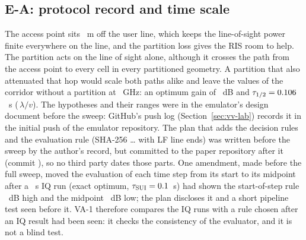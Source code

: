 \subsection{E-A: protocol record and time scale}
The access point sits \numEaApOffsetM~m off the user line, which keeps
the line-of-sight power finite everywhere on the line, and the partition loss gives the RIS
room to help. The partition acts on the line of sight alone, although it crosses the path from
the access point to every cell in every partitioned geometry. A partition that also attenuated
that hop would scale both paths alike and leave the values of the corridor without a
partition at \numEaFcOneGHz~GHz: an optimum gain of \numEaGainAzero~dB and
$\tau_{1/2}=0.106$~s (\numEaTauLvNoPart\,$\lambda/v$). The
hypotheses and their ranges were in the emulator's design document before the sweep: GitHub's
push log (Section~\ref{sec:vv-lab}) records it in the initial push of the emulator repository.
The plan that adds the decision rules and the evaluation rule (SHA-256 \txtEaPlanSha\ldots{}
with LF line ends) was written before the sweep by the author's record, but committed to the
paper repository after it (commit \txtEaPlanCommit), so no third party dates those parts. One
amendment, made before the full sweep, moved the evaluation of each time step from its start
to its midpoint after a \numEaSmokeS~s IQ run (exact optimum,
$\tau_{\mathrm{SUI}}=0.1$~s) had shown the start-of-step rule \numEaSmokeLeftDb~dB
high and the midpoint \numEaSmokeMidDb~dB low; the plan discloses it and a short pipeline test
seen before it. VA-1 therefore compares the IQ runs with a rule chosen after an IQ result had
been seen: it checks the consistency of the evaluator, and it is not a blind test.

